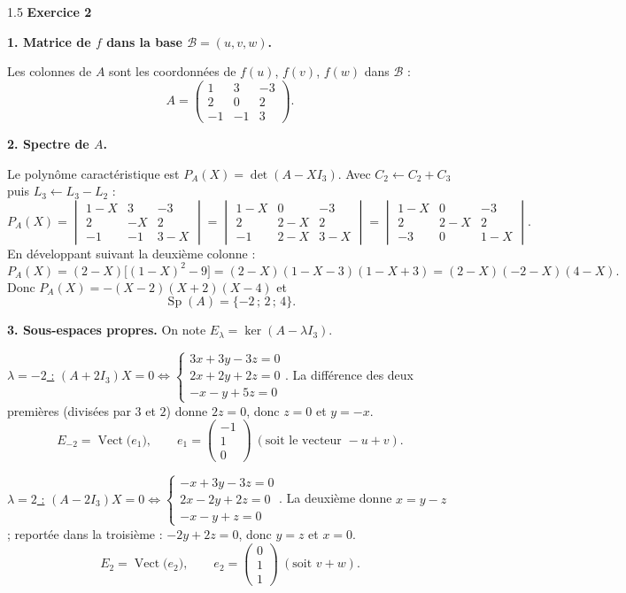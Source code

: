\documentclass[12pt]{article}
\begin{document}
\begin{spacing}{1.5}
\textbf{Exercice 2}

\textbf{1. Matrice de $f$ dans la base $\mathcal{B}=(u,v,w)$.}

Les colonnes de $A$ sont les coordonnées de $f(u)$, $f(v)$, $f(w)$ dans $\mathcal{B}$ :
\[
A=\begin{pmatrix}
1 & 3 & -3 \\
2 & 0 & 2 \\
-1 & -1 & 3
\end{pmatrix}.
\]

\textbf{2. Spectre de $A$.}

Le polynôme caractéristique est $P_A(X)=\det(A-XI_3)$. Avec $C_2\leftarrow C_2+C_3$ puis $L_3\leftarrow L_3-L_2$ :
\[
P_A(X)=\begin{vmatrix}
1-X & 3 & -3 \\
2 & -X & 2 \\
-1 & -1 & 3-X
\end{vmatrix}
=\begin{vmatrix}
1-X & 0 & -3 \\
2 & 2-X & 2 \\
-1 & 2-X & 3-X
\end{vmatrix}
=\begin{vmatrix}
1-X & 0 & -3 \\
2 & 2-X & 2 \\
-3 & 0 & 1-X
\end{vmatrix}.
\]
En développant suivant la deuxième colonne :
\[
P_A(X)=(2-X)\big[(1-X)^2-9\big]=(2-X)(1-X-3)(1-X+3)=(2-X)(-2-X)(4-X).
\]
Donc $P_A(X)=-(X-2)(X+2)(X-4)$ et
\[
\boxed{\operatorname{Sp}(A)=\{-2\,;\,2\,;\,4\}}.
\]

\textbf{3. Sous-espaces propres.} On note $E_\lambda=\ker(A-\lambda I_3)$.

\underline{$\lambda=-2$ :} $(A+2I_3)X=0 \iff \begin{cases}3x+3y-3z=0\\2x+2y+2z=0\\-x-y+5z=0\end{cases}$. La différence des deux premières (divisées par $3$ et $2$) donne $2z=0$, donc $z=0$ et $y=-x$.
\[
E_{-2}=\operatorname{Vect}\big(e_1\big),\qquad e_1=\begin{pmatrix}-1\\1\\0\end{pmatrix}\ (\text{soit le vecteur } -u+v).
\]

\underline{$\lambda=2$ :} $(A-2I_3)X=0 \iff \begin{cases}-x+3y-3z=0\\2x-2y+2z=0\\-x-y+z=0\end{cases}$. La deuxième donne $x=y-z$ ; reportée dans la troisième : $-2y+2z=0$, donc $y=z$ et $x=0$.
\[
E_{2}=\operatorname{Vect}\big(e_2\big),\qquad e_2=\begin{pmatrix}0\\1\\1\end{pmatrix}\ (\text{soit } v+w).
\]


\end{spacing}
\end{document}

